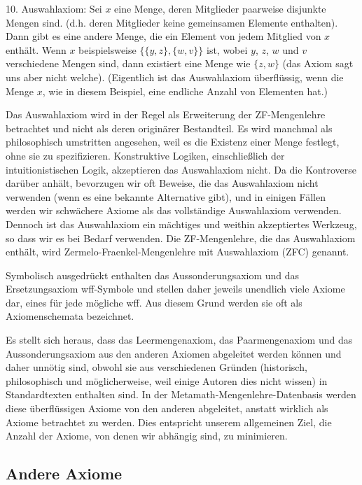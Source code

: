 10. Auswahlaxiom:  Sei $x$ eine Menge, deren Mitglieder paarweise disjunkte Mengen sind. (d.h. deren Mitglieder keine gemeinsamen Elemente enthalten).  Dann gibt es eine andere Menge, die ein Element von jedem Mitglied von $x$ enthält.  Wenn $x$ beispielsweise $\{\{y,z\},\{w,v\}\}$ ist, wobei $y$, $z$, $w$ und $v$ verschiedene Mengen sind, dann existiert eine Menge wie $\{z,w\}$ (das Axiom sagt uns aber nicht welche).  (Eigentlich ist das Auswahlaxiom überflüssig, wenn die Menge $x$, wie in diesem Beispiel, eine endliche Anzahl von Elementen hat.)

Das Auswahlaxiom wird in der Regel als Erweiterung der ZF-Mengenlehre betrachtet und nicht als deren originärer Bestandteil.  Es wird manchmal als philosophisch umstritten angesehen, weil es die Existenz einer Menge festlegt, ohne sie zu spezifizieren. Konstruktive Logiken, einschließlich der intuitionistischen Logik, akzeptieren das Auswahlaxiom nicht. Da die Kontroverse darüber anhält, bevorzugen wir oft Beweise, die das Auswahlaxiom nicht verwenden (wenn es eine bekannte Alternative gibt), und in einigen Fällen werden wir schwächere Axiome als das vollständige Auswahlaxiom verwenden. Dennoch ist das Auswahlaxiom ein mächtiges und weithin akzeptiertes Werkzeug, so dass wir es bei Bedarf verwenden. Die ZF-Mengenlehre, die das Auswahlaxiom enthält, wird Zermelo-Fraenkel-Mengenlehre mit Auswahlaxiom (ZFC) genannt.

Symbolisch ausgedrückt enthalten das Aussonderungsaxiom und das Ersetzungsaxiom wff-Symbole und stellen daher jeweils unendlich viele Axiome dar, eines für jede mögliche wff. Aus diesem Grund werden sie oft als Axiomenschemata bezeichnet.

Es stellt sich heraus, dass das Leermengenaxiom, das Paarmengenaxiom und das Aussonderungsaxiom aus den anderen Axiomen abgeleitet werden können und daher unnötig sind, obwohl sie aus verschiedenen Gründen (historisch, philosophisch und möglicherweise, weil einige Autoren dies nicht wissen) in Standardtexten enthalten sind.  In der Metamath-Mengenlehre-Datenbasis werden diese überflüssigen Axiome von den anderen abgeleitet, anstatt wirklich als Axiome betrachtet zu werden. Dies entspricht unserem allgemeinen Ziel, die Anzahl der Axiome, von denen wir abhängig sind, zu minimieren.

\subsection{Andere Axiome}

